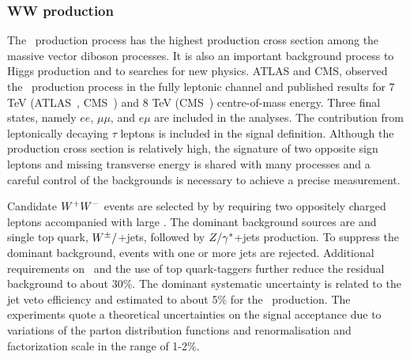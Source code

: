 \subsubsection{WW production}
\label{sss-WWprod}

The \WW\ production process has the highest production cross section
among the massive vector diboson processes. It is also an important
background process to Higgs production and to searches for new physics.
ATLAS and CMS, observed the \WW\ production process in 
the fully leptonic channel and published results for 7 TeV 
(ATLAS~\cite{ATLAS:2012mec}, CMS~\cite{Chatrchyan:2013yaa}) and
8 TeV (CMS~\cite{Chatrchyan:2013oev}) centre-of-mass energy. 
Three final states, namely $ee$, $\mu\mu$, and $e\mu$ are included in the analyses. 
The contribution from leptonically decaying $\tau$ leptons is included in the signal
definition. Although the production cross section is relatively high, the signature of two opposite 
sign leptons and missing transverse energy is shared with many processes and a careful
control of the backgrounds is necessary to achieve a precise measurement.


Candidate $W^+W^-$ events are selected by by requiring two oppositely charged leptons 
accompanied with large \MET. 
The dominant background sources are \ttbar\; and single top quark, 
$W^{\pm}/$+jets, followed by $Z/\gamma^{*}$+jets production.
To suppress the dominant \ttbar\; background, events with one or more jets are rejected.   
Additional requirements on \MET\ and the use of top quark-taggers further reduce the residual background
to about 30\%.  
The dominant systematic uncertainty is related to the jet veto efficiency 
and estimated to about 5\% for the \WW\, production. 
The experiments quote a theoretical uncertainties on the signal acceptance due to 
variations of the parton distribution functions and renormalisation and factorization 
scale in the range of 1-2\%.

